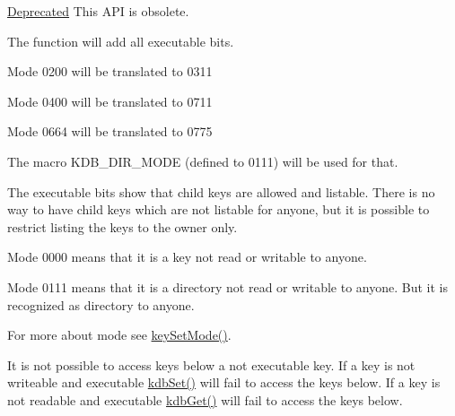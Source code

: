 \begin{Desc}
\item[\hyperlink{deprecated__deprecated000006}{Deprecated}]This API is obsolete.\end{Desc}


The function will add all executable bits.


\begin{DoxyItemize}
\item Mode 0200 will be translated to 0311
\item Mode 0400 will be translated to 0711
\item Mode 0664 will be translated to 0775
\end{DoxyItemize}

The macro KDB\_\-DIR\_\-MODE (defined to 0111) will be used for that.

The executable bits show that child keys are allowed and listable. There is no way to have child keys which are not listable for anyone, but it is possible to restrict listing the keys to the owner only.


\begin{DoxyItemize}
\item Mode 0000 means that it is a key not read or writable to anyone.
\item Mode 0111 means that it is a directory not read or writable to anyone. But it is recognized as directory to anyone.
\end{DoxyItemize}

For more about mode see \hyperlink{group__keymeta_ga8803037e35b9da1ce492323a88ff6bc3}{keySetMode()}.

It is not possible to access keys below a not executable key. If a key is not writeable and executable \hyperlink{group__kdb_ga11436b058408f83d303ca5e996832bcf}{kdbSet()} will fail to access the keys below. If a key is not readable and executable \hyperlink{group__kdb_ga28e385fd9cb7ccfe0b2f1ed2f62453a1}{kdbGet()} will fail to access the keys below.


